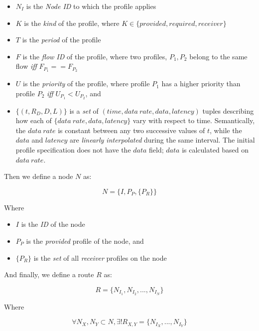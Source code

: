 \begin{itemize}
\item $N_I$ is the \emph{Node ID} to which the profile applies
\item $K$ is the \emph{kind} of the profile, where
  $K\in\{provided,required,receiver\}$
\item $T$ is the \emph{period} of the profile
\item $F$ is the \emph{flow ID} of the profile, where two profiles,
  $P_1,P_2$ belong to the same flow \emph{iff}
  $F_{P_1}==F_{P_2}$
\item $U$ is the \emph{priority} of the profile, where profile
  $P_1$ has a higher priority than profile $P_2$ \emph{iff}
  $U_{P_1} < U_{P_2}$, and
\item $\{(t,R_D,D,L)\}$ is a \emph{set} of $(time, data\ rate,
  data, latency)$ tuples describing how each of $\{data\ rate,
  data, latency\}$ vary with respect to time.  Semantically, the
  $data\ rate$ is constant between any two successive values of
  $t$, while the $data$ and $latency$ are \emph{linearly
  interpolated} during the same interval.  The initial profile
  specification does not have the $data$ field; $data$ is
  calculated based on $data\ rate$.
\end{itemize}

Then we define a node $N$ as:

\begin{equation}
  N = \{I,P_P,\{P_R\}\}
\end{equation}

Where 

\begin{itemize}
\item $I$ is the \emph{ID} of the node
\item $P_P$ is the \emph{provided} profile of the node, and
\item $\{P_R\}$ is the \emph{set} of all \emph{receiver} profiles on the node
\end{itemize}

And finally, we define a route $R$ as:

\begin{equation}
  R = \{N_{I_1},N_{I_2},...,N_{I_N}\}
\end{equation}

Where

\begin{equation}
  \forall N_X,N_Y \subset N, \exists! R_{X,Y} = \{N_{I_X},...,N_{I_Y}\}
\end{equation}

